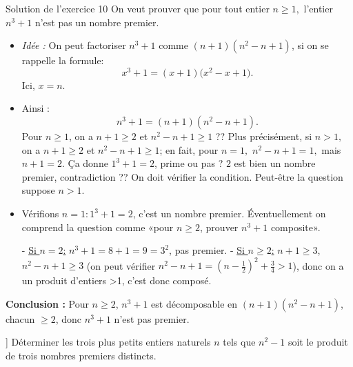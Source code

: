 \documentclass[a4paper,12pt]{article}
\begin{document}
\begin{solutionbox}{Solution de l'exercice 10}
On veut prouver que pour tout entier $n\ge1,$ l’entier $n^3+1$ n’est pas un nombre premier.

\begin{itemize}
  \item \textit{Idée :} On peut factoriser $n^3+1$ comme $(n+1)(n^2-n+1)$, si on se rappelle la formule:
    \[
     x^3+1=(x+1)\bigl(x^2-x+1\bigr).
    \]
    Ici, $x=n$.
  
  \item Ainsi :
    \[
     n^3+1 = (n+1)(n^2-n+1).
    \]
    Pour $n\ge1$, on a $n+1\ge2$ et $n^2-n+1\ge 1$ ?? Plus précisément, si $n>1,$ on a $n+1\ge2$ et $n^2-n+1\ge 1$; en fait, pour $n=1,$ $n^2-n+1=1,$ mais $n+1=2$. Ça donne $1^3+1=2$, prime ou pas ? $2$ est bien un nombre premier, contradiction ?? On doit vérifier la condition. Peut-être la question suppose $n>1$.  

  \item Vérifions $n=1 : 1^3+1=2$, c’est un nombre premier. Éventuellement on comprend la question comme «pour $n\ge2$, prouver $n^3+1$ composite».  

    - \underline{Si $n=2$:} $n^3+1=8+1=9=3^2$, pas premier.
    - \underline{Si $n\ge2$:} $n+1\ge3$, $n^2-n+1\ge 3$ (on peut vérifier $n^2-n+1=(n-\tfrac12)^2 +\tfrac34>1$), donc on a un produit d'entiers >1, c’est donc composé.

\end{itemize}

\textbf{Conclusion :} Pour $n\ge2$, $n^3+1$ est décomposable en $(n+1)(n^2-n+1)$, chacun $\ge2$, donc $n^3+1$ n’est pas premier.

\end{solutionbox}

\begin{exercice}[title=Exercice 12 $\star\star$ -- [Chercher]]
Déterminer les trois plus petits entiers naturels $n$ tels que $n^2 -1$ soit le produit de trois nombres premiers distincts.
\end{exercice}
\end{document}
